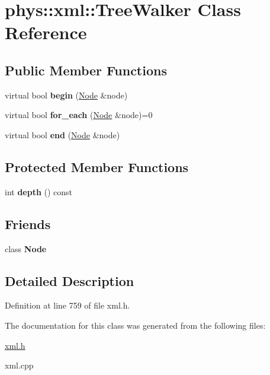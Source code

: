 \hypertarget{classphys_1_1xml_1_1TreeWalker}{
\section{phys::xml::TreeWalker Class Reference}
\label{d5/d8d/classphys_1_1xml_1_1TreeWalker}
}
\subsection*{Public Member Functions}
\begin{DoxyCompactItemize}
\item 
\hypertarget{classphys_1_1xml_1_1TreeWalker_a9f470ce9aa667b78a0281d5f87d09e0e}{
virtual bool {\bfseries begin} (\hyperlink{classphys_1_1xml_1_1Node}{Node} \&node)}
\label{d5/d8d/classphys_1_1xml_1_1TreeWalker_a9f470ce9aa667b78a0281d5f87d09e0e}

\item 
\hypertarget{classphys_1_1xml_1_1TreeWalker_a7fc883fd9b8eeff896c8822cf5b514d3}{
virtual bool {\bfseries for\_\-each} (\hyperlink{classphys_1_1xml_1_1Node}{Node} \&node)=0}
\label{d5/d8d/classphys_1_1xml_1_1TreeWalker_a7fc883fd9b8eeff896c8822cf5b514d3}

\item 
\hypertarget{classphys_1_1xml_1_1TreeWalker_a1486c30615d1de6622f997c28594aeae}{
virtual bool {\bfseries end} (\hyperlink{classphys_1_1xml_1_1Node}{Node} \&node)}
\label{d5/d8d/classphys_1_1xml_1_1TreeWalker_a1486c30615d1de6622f997c28594aeae}

\end{DoxyCompactItemize}
\subsection*{Protected Member Functions}
\begin{DoxyCompactItemize}
\item 
\hypertarget{classphys_1_1xml_1_1TreeWalker_ab2693802beae6312239507a679e2624a}{
int {\bfseries depth} () const }
\label{d5/d8d/classphys_1_1xml_1_1TreeWalker_ab2693802beae6312239507a679e2624a}

\end{DoxyCompactItemize}
\subsection*{Friends}
\begin{DoxyCompactItemize}
\item 
\hypertarget{classphys_1_1xml_1_1TreeWalker_a6db9d28bd448a131448276ee03de1e6d}{
class {\bfseries Node}}
\label{d5/d8d/classphys_1_1xml_1_1TreeWalker_a6db9d28bd448a131448276ee03de1e6d}

\end{DoxyCompactItemize}


\subsection{Detailed Description}


Definition at line 759 of file xml.h.



The documentation for this class was generated from the following files:\begin{DoxyCompactItemize}
\item 
\hyperlink{xml_8h}{xml.h}\item 
xml.cpp\end{DoxyCompactItemize}
